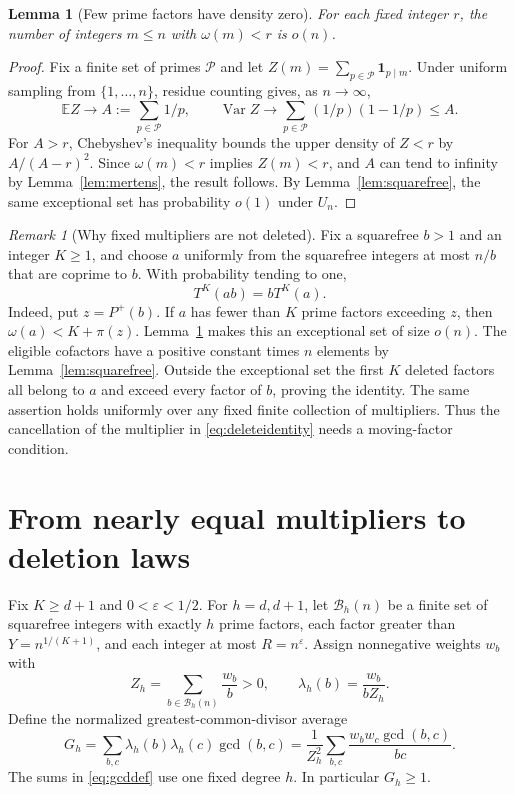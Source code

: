 \documentclass[11pt]{article}
\newtheorem{lemma}[theorem]{Lemma}
\theoremstyle{remark}\newtheorem{remark}[theorem]{Remark}
\DeclareMathOperator{\Var}{Var}
\newcommand{\E}{\mathbb E}
\newcommand{\ind}{\mathbf 1}
\begin{document}
\begin{lemma}[Few prime factors have density zero]\label{lem:few}
For each fixed integer $r$, the number of integers $m\le n$ with $\omega(m)<r$ is $o(n)$.
\end{lemma}
\begin{proof}
Fix a finite set of primes $\mathcal P$ and let $Z(m)=\sum_{p\in\mathcal P}\ind_{p\mid m}$. Under uniform sampling from $\{1,\ldots,n\}$, residue counting gives, as $n\to\infty$,
\[
 \E Z\longrightarrow A:=\sum_{p\in\mathcal P}1/p,
 \qquad \Var Z\longrightarrow\sum_{p\in\mathcal P}(1/p)(1-1/p)\le A.
\]
For $A>r$, Chebyshev's inequality bounds the upper density of $Z<r$ by $A/(A-r)^2$. Since $\omega(m)<r$ implies $Z(m)<r$, and $A$ can tend to infinity by Lemma~\ref{lem:mertens}, the result follows. By Lemma~\ref{lem:squarefree}, the same exceptional set has probability $o(1)$ under $U_n$.
\end{proof}

\begin{remark}[Why fixed multipliers are not deleted]\label{rem:fixed}
Fix a squarefree $b>1$ and an integer $K\ge1$, and choose $a$ uniformly from the squarefree integers at most $n/b$ that are coprime to $b$. With probability tending to one,
\[
 T^K(ab)=bT^K(a).
\]
Indeed, put $z=P^+(b)$. If $a$ has fewer than $K$ prime factors exceeding $z$, then $\omega(a)<K+\pi(z)$. Lemma~\ref{lem:few} makes this an exceptional set of size $o(n)$. The eligible cofactors have a positive constant times $n$ elements by Lemma~\ref{lem:squarefree}. Outside the exceptional set the first $K$ deleted factors all belong to $a$ and exceed every factor of $b$, proving the identity. The same assertion holds uniformly over any fixed finite collection of multipliers. Thus the cancellation of the multiplier in \eqref{eq:deleteidentity} needs a moving-factor condition.
\end{remark}

\section{From nearly equal multipliers to deletion laws}

Fix $K\ge d+1$ and $0<\varepsilon<1/2$. For $h=d,d+1$, let $\mathcal B_h(n)$ be a finite set of squarefree integers with exactly $h$ prime factors, each factor greater than $Y=n^{1/(K+1)}$, and each integer at most $R=n^\varepsilon$. Assign nonnegative weights $w_b$ with
\[
 Z_h=\sum_{b\in\mathcal B_h(n)}\frac{w_b}{b}>0,
 \qquad \lambda_h(b)=\frac{w_b}{bZ_h}.
\]
Define the normalized greatest-common-divisor average
\begin{equation}\label{eq:gcddef}
 G_h=\sum_{b,c}\lambda_h(b)\lambda_h(c)\gcd(b,c)
 =\frac1{Z_h^2}\sum_{b,c}\frac{w_bw_c\gcd(b,c)}{bc}.
\end{equation}
The sums in \eqref{eq:gcddef} use one fixed degree $h$. In particular $G_h\ge1$.
\end{document}
